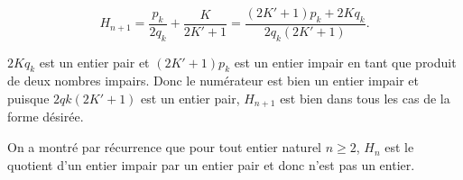 {{\begin{itemize}
$$H_{n+1}=\frac{p_k}{2q_k}+\frac{K}{2K'+1}=\frac{(2K'+1)p_k+2Kq_k}{2q_k(2K'+1)}.$$

$2Kq_k$ est un entier pair et $(2K'+1)p_k$ est un entier impair en tant que produit de deux nombres impairs. Donc le
numérateur est bien un entier impair et puisque $2qk(2K'+1)$ est un entier pair, $H_{n+1}$ est bien dans tous les cas de
la forme désirée.
\end{itemize}
On a montré par récurrence que pour tout entier naturel $n\geq2$, $H_n$ est le quotient d'un entier impair par un entier pair
et donc n'est pas un entier.
}
}

